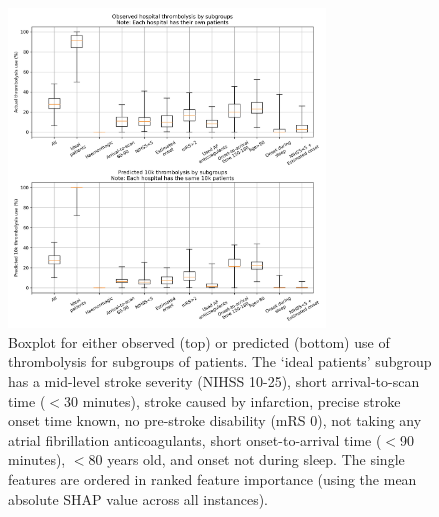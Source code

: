 \begin{figure}[!h]
\centering
\includegraphics[width=0.75\textwidth]{./images/04c_xgb_10_features_10k_cohort_actual_vs_modelled_subgroup_boxplot}
\caption{Boxplot for either observed (top) or predicted (bottom) use of thrombolysis for subgroups of patients. The `ideal patients' subgroup has a mid-level stroke severity (NIHSS 10-25), short arrival-to-scan time ($<$30 minutes), stroke caused by infarction, precise stroke onset time known, no pre-stroke disability (mRS 0), not taking any atrial fibrillation anticoagulants, short onset-to-arrival time ($<$90 minutes), $<$80 years old, and onset not during sleep. The single features are ordered in ranked feature importance (using the mean absolute SHAP value across all instances).}
\label{fig:results_boxplot}
\end{figure}